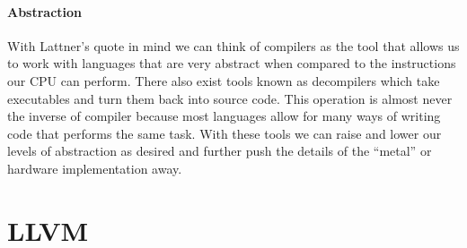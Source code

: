 \paragraph{Abstraction} With Lattner's quote in mind we can think of compilers as the tool that allows us to work with languages that are very abstract when compared to the instructions our \ac{CPU} can perform.
There also exist tools known as decompilers which take executables and turn them back into source code.
This operation is almost never the inverse of compiler because most languages allow for many ways of writing code that performs the same task.
With these tools we can raise and lower our levels of abstraction as desired and further push the details of the ``metal'' or hardware implementation away.


\section{LLVM}

